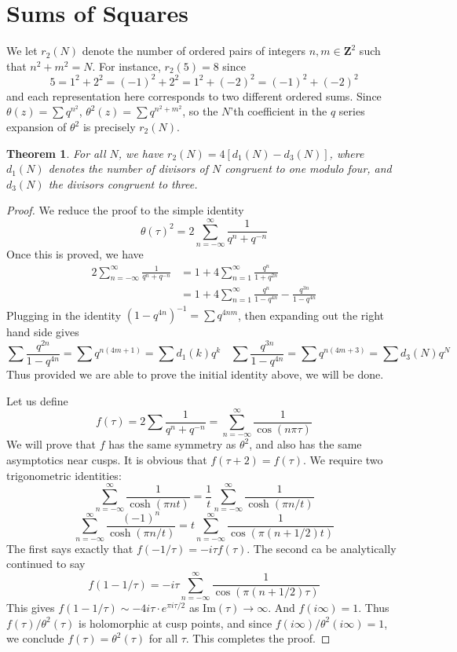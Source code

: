 \documentclass{article}
\theoremstyle{plain}
\newtheorem{theorem}{Theorem}
\theoremstyle{remark}
\theoremstyle{definition}
\begin{document}
\section{Sums of Squares}

We let $r_2(N)$ denote the number of ordered pairs of integers $n,m \in \mathbf{Z}^2$ such that $n^2 + m^2 = N$. For instance, $r_2(5) = 8$ since
%
\[ 5 = 1^2 + 2^2 = (-1)^2 + 2^2 = 1^2 + (-2)^2 = (-1)^2 + (-2)^2 \]
%
and each representation here corresponds to two different ordered sums. Since $\theta(z) = \sum q^{n^2}$, $\theta^2(z) = \sum q^{n^2 + m^2}$, so the $N$'th coefficient in the $q$ series expansion of $\theta^2$ is precisely $r_2(N)$.

\begin{theorem}
    For all $N$, we have $r_2(N) = 4[d_1(N) - d_3(N)]$, where $d_1(N)$ denotes the number of divisors of $N$ congruent to one modulo four, and $d_3(N)$ the divisors congruent to three.
\end{theorem}
\begin{proof}
    We reduce the proof to the simple identity
    \[ \theta(\tau)^2 = 2 \sum_{n = -\infty}^\infty \frac{1}{q^n + q^{-n}} \]
    Once this is proved, we have
    \begin{align*}
        2 \sum_{n = -\infty}^\infty \frac{1}{q^n + q^{-n}} &= 1 + 4 \sum_{n = 1}^\infty \frac{q^{n}}{1 + q^{2n}}\\
        &= 1 + 4 \sum_{n = 1}^\infty \frac{q^n}{1 - q^{4n}} - \frac{q^{3n}}{1 - q^{4n}}
    \end{align*}
    Plugging in the identity $(1 - q^{4n})^{-1} = \sum q^{4nm}$, then expanding out the right hand side gives
    \[ \sum \frac{q^{2n}}{1 - q^{4n}} = \sum q^{n(4m + 1)} = \sum d_1(k) q^k\ \ \ \ \sum \frac{q^{3n}}{1 - q^{4n}} = \sum q^{n(4m + 3)} = \sum d_3(N) q^N \]
    Thus provided we are able to prove the initial identity above, we will be done.

    Let us define
    \[ f(\tau) = 2 \sum \frac{1}{q^n + q^{-n}} = \sum_{n = -\infty}^\infty \frac{1}{\cos(n \pi \tau)} \]
    We will prove that $f$ has the same symmetry as $\theta^2$, and also has the same asymptotics near cusps. It is obvious that $f(\tau + 2) = f(\tau)$. We require two trigonometric identities:
    \[ \sum_{n = -\infty}^\infty \frac{1}{\cosh(\pi n t)} = \frac{1}{t} \sum_{n = -\infty}^\infty \frac{1}{\cosh(\pi n/t)} \]
    \[ \sum_{n = -\infty}^\infty \frac{(-1)^n}{\cosh(\pi n/t)} = t \sum_{n = -\infty}^\infty \frac{1}{\cos(\pi(n + 1/2)t)} \]
    The first says exactly that $f(-1/\tau) = -i\tau f(\tau)$. The second ca be analytically continued to say
    \[ f(1 - 1/\tau) = -i \tau \sum_{n = -\infty}^\infty \frac{1}{\cos(\pi(n + 1/2)\tau)} \]
    This gives $f(1 - 1/\tau) \sim -4i \tau \cdot e^{\pi i \tau/2}$ as $\text{Im}(\tau) \to \infty$. And $f(i \infty) = 1$. Thus $f(\tau)/\theta^2(\tau)$ is holomorphic at cusp points, and since $f(i\infty)/\theta^2(i \infty) = 1$, we conclude $f(\tau) = \theta^2(\tau)$ for all $\tau$. This completes the proof.
\end{proof}
\end{document}
